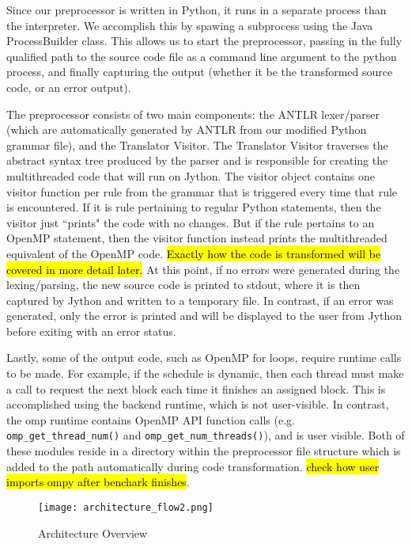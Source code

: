 \documentclass[letterpaper,12pt]{article} %
\begin{document}
Since our preprocessor is written in Python, it runs in a separate process than the interpreter. We accomplish this by spawing a subprocess using the Java ProcessBuilder class. This allows us to start the preprocessor, passing in the fully qualified path to the source code file as a command line argument to the python process, and finally capturing the output (whether it be the transformed source code, or an error output). 

The preprocessor consists of two main components: the ANTLR lexer/parser (which are automatically generated by ANTLR from our modified Python grammar file), and the Translator Visitor. The Translator Visitor traverses the abstract syntax tree produced by the parser and is responsible for creating the multithreaded code that will run on Jython. The visitor object contains one visitor function per rule from the grammar that is  triggered every time that rule is encountered. If it is rule pertaining to regular Python statements, then the visitor just ``prints" the code with no changes. But if the rule pertains to an OpenMP statement, then the visitor function instead prints the  multithreaded equivalent of the OpenMP code. \hl{Exactly how the code is transformed will be covered in more detail later.} At this point, if no errors were generated during the lexing/parsing, the new source code is printed to stdout, where it is then captured by Jython and written to a temporary file. In contrast, if an error was generated, only the error is printed and will be displayed to the user from Jython before exiting with an error status.  

Lastly, some of the output code, such as OpenMP for loops, require runtime calls to be made. For example, if the schedule is dynamic, then each thread must make a call to request the next block each time it finishes an assigned block. This is accomplished using the backend runtime, which is not user-visible. In contrast, the omp runtime contains OpenMP API function calls (e.g. \texttt{omp\_get\_thread\_num()} and \texttt{omp\_get\_num\_threads()}), and is user visible. Both of these modules reside in a directory within the preprocessor file structure which is added to the path automatically during code transformation. \hl{check how user imports ompy after benchark finishes}.  

\begin{figure} [H]
    \centering
          {\texttt{[image: architecture\_flow2.png]}}
        \caption{Architecture Overview}
        \label{fig:arch_flow}
    \centering
\end{figure}
\end{document}
